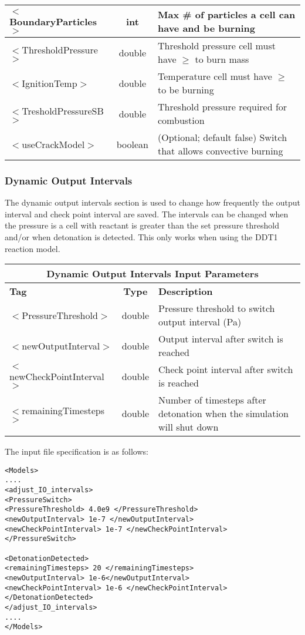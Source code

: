\begin{center}
\begin{tabular}{| l | c | p{7cm} |}
\hline
  $<$BoundaryParticles$>$ & int & Max \# of particles a cell can have and be burning  \\
\hline
  $<$ThresholdPressure$>$ & double & Threshold pressure cell must have $\ge$ to burn mass \\
\hline
  $<$IgnitionTemp$>$ & double & Temperature cell must have $\ge$ to be burning \\
\hline
  $<$TresholdPressureSB$>$ & double & Threshold pressure required for combustion \\
\hline
  $<$useCrackModel$>$ & boolean & (Optional; default false) Switch that allows convective burning \\
\hline
\end{tabular}
\end{center}



\newpage
\subsubsection{Dynamic Output Intervals} \label {Sec:DDT1}
The dynamic output intervals section is used to change how frequently the output interval and check point interval are saved. The intervals can be changed when the pressure is a cell with reactant is greater than the set pressure threshold and/or when detonation is detected. This only works when using the DDT1 reaction model.


\begin{center}
\begin{tabular}{| l | c | p{7cm} |}
\hline
  \multicolumn{3}{|c|}{\textbf{Dynamic Output Intervals Input Parameters}} \\
\hline
\hline
  \textbf{Tag} & \textbf{Type} & \textbf{Description}\\
\hline
  $<$PressureThreshold$>$ & double & Pressure threshold to switch output interval (Pa)\\
\hline
  $<$newOutputInterval$>$ & double & Output interval after switch is reached\\
\hline
  $<$newCheckPointInterval$>$ & double & Check point interval after switch is reached\\
\hline
  $<$remainingTimesteps$>$ & double & Number of timesteps after detonation when the simulation will shut down\\
\hline
\end{tabular}
\end{center}


The input file specification is as follows:
\begin{verbatim}
<Models>
....
<adjust_IO_intervals>
<PressureSwitch>
<PressureThreshold> 4.0e9 </PressureThreshold>
<newOutputInterval> 1e-7 </newOutputInterval>
<newCheckPointInterval> 1e-7 </newCheckPointInterval>
</PressureSwitch>

<DetonationDetected>
<remainingTimesteps> 20 </remainingTimesteps>
<newOutputInterval> 1e-6</newOutputInterval>
<newCheckPointInterval> 1e-6 </newCheckPointInterval>
</DetonationDetected>
</adjust_IO_intervals>
....
</Models> 
\end{verbatim}

